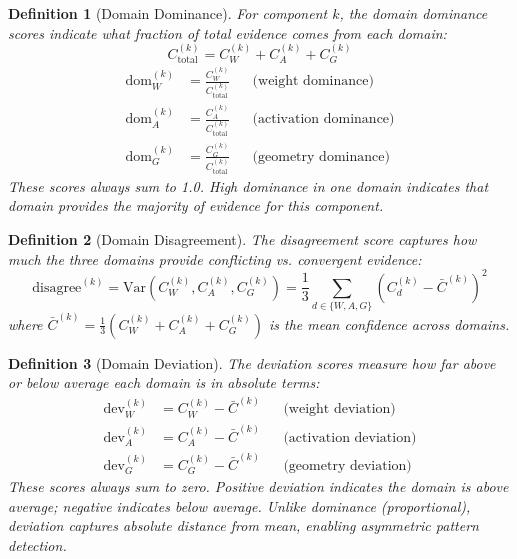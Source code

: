 \documentclass[11pt]{article}
\newtheorem{definition}{Definition}[section]
\begin{document}
\begin{definition}[Domain Dominance]
\label{def:domain-dominance}
For component $k$, the domain dominance scores indicate what fraction of total evidence comes from each domain:
\begin{equation}
C_{\text{total}}^{(k)} = C^{(k)}_W + C^{(k)}_A + C^{(k)}_G
\end{equation}
\begin{align}
\text{dom}_W^{(k)} &= \frac{C^{(k)}_W}{C_{\text{total}}^{(k)}} & &\text{(weight dominance)} \\[0.5em]
\text{dom}_A^{(k)} &= \frac{C^{(k)}_A}{C_{\text{total}}^{(k)}} & &\text{(activation dominance)} \\[0.5em]
\text{dom}_G^{(k)} &= \frac{C^{(k)}_G}{C_{\text{total}}^{(k)}} & &\text{(geometry dominance)}
\end{align}
These scores always sum to 1.0. High dominance in one domain indicates that domain provides the majority of evidence for this component.
\end{definition}

\begin{definition}[Domain Disagreement]
\label{def:domain-disagreement}
The disagreement score captures how much the three domains provide conflicting vs. convergent evidence:
\begin{equation}
\text{disagree}^{(k)} = \text{Var}(C^{(k)}_W, C^{(k)}_A, C^{(k)}_G) = \frac{1}{3}\sum_{d \in \{W,A,G\}} \left(C^{(k)}_d - \bar{C}^{(k)}\right)^2
\end{equation}
where $\bar{C}^{(k)} = \frac{1}{3}(C^{(k)}_W + C^{(k)}_A + C^{(k)}_G)$ is the mean confidence across domains.
\end{definition}

\begin{definition}[Domain Deviation]
\label{def:domain-deviation}
The deviation scores measure how far above or below average each domain is in absolute terms:
\begin{align}
\text{dev}_W^{(k)} &= C^{(k)}_W - \bar{C}^{(k)} & &\text{(weight deviation)} \\[0.5em]
\text{dev}_A^{(k)} &= C^{(k)}_A - \bar{C}^{(k)} & &\text{(activation deviation)} \\[0.5em]
\text{dev}_G^{(k)} &= C^{(k)}_G - \bar{C}^{(k)} & &\text{(geometry deviation)}
\end{align}
These scores always sum to zero. Positive deviation indicates the domain is above average; negative indicates below average. Unlike dominance (proportional), deviation captures absolute distance from mean, enabling asymmetric pattern detection.
\end{definition}
\end{document}
